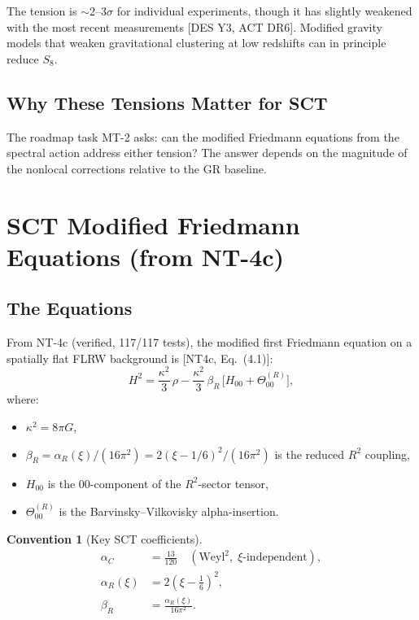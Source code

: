 \documentclass[11pt,a4paper]{article}
\theoremstyle{plain}
\theoremstyle{definition}
\newtheorem{convention}[theorem]{Convention}
\theoremstyle{remark}
\newcommand{\fromlit}[1]{\textcolor{blue!70!black}{\textsf{[#1]}}}
\begin{document}
The tension is $\sim 2\text{--}3\sigma$ for individual experiments,
though it has slightly weakened with the most recent measurements
\fromlit{DES Y3, ACT DR6}. Modified gravity models that weaken
gravitational clustering at low redshifts can in principle reduce
$S_8$.

\subsection{Why These Tensions Matter for SCT}

The roadmap task MT-2 asks: can the modified Friedmann equations from
the spectral action address either tension? The answer depends on the
magnitude of the nonlocal corrections relative to the GR baseline.

\section{SCT Modified Friedmann Equations (from NT-4c)}
\label{sec:sct-friedmann}

\subsection{The Equations}

From NT-4c (verified, 117/117 tests), the modified first Friedmann
equation on a spatially flat FLRW background is \fromlit{NT4c,
Eq.~(4.1)}:
\begin{equation}\label{eq:mod-friedmann}
  H^2 = \frac{\kappa^2}{3}\,\rho
  - \frac{\kappa^2}{3}\,\beta_R\,
  \bigl[H_{00} + \Theta^{(R)}_{00}\bigr],
\end{equation}
where:
\begin{itemize}[nosep]
  \item $\kappa^2 = 8\pi G$,
  \item $\beta_R = \alpha_R(\xi)/(16\pi^2) = 2(\xi - 1/6)^2/(16\pi^2)$
    is the reduced $R^2$ coupling,
  \item $H_{00}$ is the 00-component of the $R^2$-sector tensor,
  \item $\Theta^{(R)}_{00}$ is the Barvinsky--Vilkovisky alpha-insertion.
\end{itemize}

\begin{convention}[Key SCT coefficients]\label{conv:coeffs}
\begin{align}
  \alpha_C &= \frac{13}{120} \quad (\text{Weyl}^2,\; \xi\text{-independent}), \\
  \alpha_R(\xi) &= 2\left(\xi - \frac{1}{6}\right)^2, \\
  \beta_R &= \frac{\alpha_R(\xi)}{16\pi^2}.
\end{align}
\end{convention}
\end{document}
